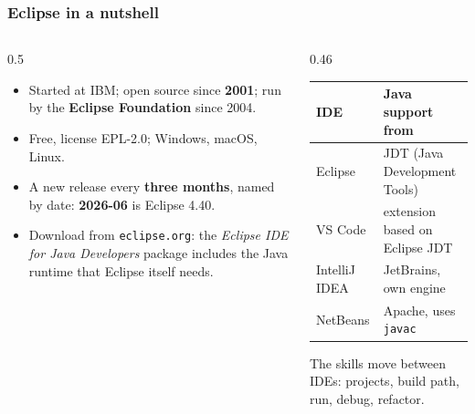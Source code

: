 \documentclass[aspectratio=169,10pt,compress]{beamer}
\begin{document}
\begin{frame}[t,fragile] \frametitle{Eclipse in a nutshell}
  \begin{columns}[T]
    \begin{column}{0.5\textwidth}
      \begin{itemize}\small
        \item Started at IBM; open source since \textbf{2001}; run by the \textbf{Eclipse Foundation} since 2004.
        \item Free, license EPL-2.0; Windows, macOS, Linux.
        \item A new release every \textbf{three months}, named by date: \textbf{2026-06} is Eclipse 4.40.
        \item Download from \texttt{eclipse.org}: the \emph{Eclipse IDE for Java Developers} package
              includes the Java runtime that Eclipse itself needs.
      \end{itemize}
    \end{column}
    \begin{column}{0.46\textwidth}
      \begin{center}\small
      \begin{tabular}{ll}
        \toprule
        \textbf{IDE}            & \textbf{Java support from} \\
        \midrule
        Eclipse                 & JDT (Java Development Tools) \\
        VS Code                 & extension based on Eclipse JDT \\
        IntelliJ IDEA           & JetBrains, own engine \\
        NetBeans                & Apache, uses \texttt{javac} \\
        \bottomrule
      \end{tabular}
      \end{center}
      \small The skills move between IDEs: projects, build path, run, debug, refactor.
    \end{column}
  \end{columns}
\end{frame}

\end{document}
